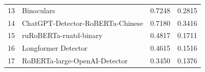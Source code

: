{\begin{tabular}{cm{6cm}@{}cc}
{\cellcolor[HTML]{F9CB9C}} 13 & {\cellcolor[HTML]{F9CB9C}} Binoculars & {\cellcolor[HTML]{F9CB9C}} 0.7248 & {\cellcolor[HTML]{F9CB9C}} 0.2815 \\
{\cellcolor[HTML]{9FC5E8}} 14 & {\cellcolor[HTML]{9FC5E8}} ChatGPT-Detector-RoBERTa-Chinese & {\cellcolor[HTML]{9FC5E8}} 0.7180 & {\cellcolor[HTML]{9FC5E8}} 0.3416 \\
{\cellcolor[HTML]{9FC5E8}} 15 & {\cellcolor[HTML]{9FC5E8}} ruRoBERTa-ruatd-binary & {\cellcolor[HTML]{9FC5E8}} 0.4817 & {\cellcolor[HTML]{9FC5E8}} 0.1711 \\
{\cellcolor[HTML]{9FC5E8}} 16 & {\cellcolor[HTML]{9FC5E8}} Longformer Detector & {\cellcolor[HTML]{9FC5E8}} 0.4615 & {\cellcolor[HTML]{9FC5E8}} 0.1516 \\
{\cellcolor[HTML]{9FC5E8}} 17 & {\cellcolor[HTML]{9FC5E8}} RoBERTa-large-OpenAI-Detector & {\cellcolor[HTML]{9FC5E8}} 0.3450 & {\cellcolor[HTML]{9FC5E8}} 0.1376 \\
\hline
\end{tabular}
}



